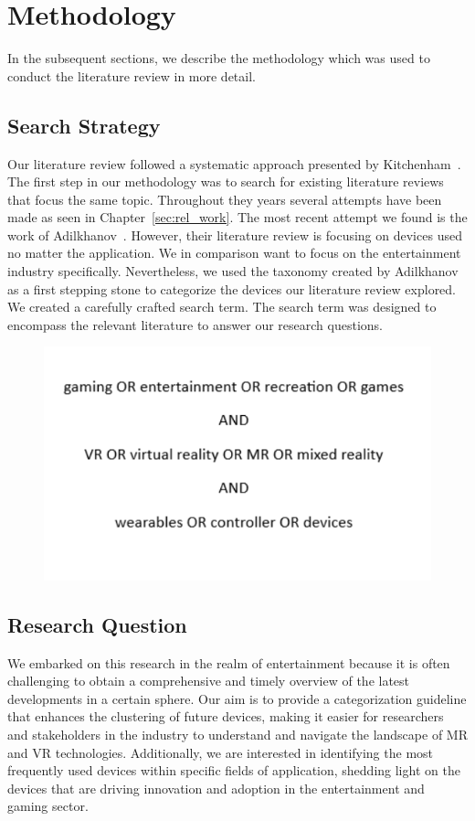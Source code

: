 \section{Methodology}
\label{sec:method}
In the subsequent sections, we describe the methodology which was used to conduct the literature review in more detail.

\subsection{Search Strategy}
Our literature review followed a systematic approach presented by Kitchenham~\cite{Kitchenham06}. The first step in our methodology was to search for existing literature reviews that focus the same topic. Throughout they years several attempts have been made as seen in Chapter~\ref{sec:rel_work}. The most recent attempt we found is the work of Adilkhanov~\cite{Adilkhanov22}. However, their literature review is focusing on devices used no matter the application. We in comparison want to focus on the entertainment industry specifically. Nevertheless, we used the taxonomy created by Adilkhanov as a first stepping stone to categorize the devices our literature review explored. We created a carefully crafted search term. The search term was designed to encompass the relevant literature to answer our research questions.

\begin{figure}[htbp]
	\includegraphics[width=\columnwidth]{figures/searchterm.pdf}
	\label{fig:searchterm}
\end{figure}


\subsection{Research Question}
We embarked on this research in the realm of entertainment because it is often challenging to obtain a comprehensive and timely overview of the latest developments in a certain sphere. Our aim is to provide a categorization guideline that enhances the clustering of future devices, making it easier for researchers and stakeholders in the industry to understand and navigate the landscape of MR and VR technologies. Additionally, we are interested in identifying the most frequently used devices within specific fields of application, shedding light on the devices that are driving innovation and adoption in the entertainment and gaming sector. 

